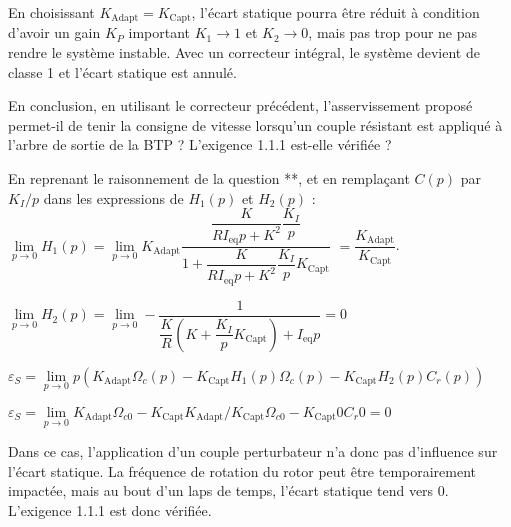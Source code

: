 \ifprof
\begin{corrige}
En choisissant $K_{\text{Adapt}}=K_{\text{Capt}}$, l’écart statique pourra être réduit à condition d’avoir un gain $K_P$ important $K_1\to 1$ et $K_2\to 0$, mais pas trop pour ne pas rendre le système instable.
Avec un correcteur intégral, le système devient de classe 1 et l’écart statique est annulé.
\end{corrige}
\else
\fi


\begin{question}
En conclusion, en utilisant le correcteur précédent, l'asservissement proposé permet-il de tenir la consigne de vitesse lorsqu'un couple résistant est appliqué à l'arbre de sortie de la BTP ? L'exigence 1.1.1 est-elle vérifiée ?
\end{question}

\ifprof
\begin{corrige}


En reprenant le raisonnement de la question **, et en remplaçant $C(p)$ par $K_I/p$ dans les expressions de $H_1 (p)$ et $H_2 (p)$ :
$\lim\limits_{p\to 0}  H_1 (p)=\lim\limits_{p\to 0}  K_{\text{Adapt}} \dfrac{\dfrac{K}{R I_{\text{eq}} p+K^2}\dfrac{ K_I}{p}}{1+\dfrac{K}{R I_{\text{eq}} p+K^2 } \dfrac{K_I}{p} K_{\text{Capt}} }$
$=\dfrac{K_{\text{Adapt}}}{K_{\text{Capt}}}$.

$\lim\limits_{p\to 0}  H_2 (p)=\lim\limits_{p\to 0}  -\dfrac{1}{\dfrac{K}{R} \left(K+\dfrac{K_I}{p} K_{\text{Capt}} \right)+I_{\text{eq}} p}=0$

$\varepsilon_S=\lim\limits_{p\to 0}  p \left(K_{\text{Adapt}} \Omega_c (p)-K_{\text{Capt}} H_1 (p) \Omega_c (p)-K_{\text{Capt}} H_2 (p) C_r (p)\right) $

$\varepsilon_S=\lim\limits_{p\to 0} K_{\text{Adapt}} \Omega_{c0}-K_{\text{Capt}} K_{\text{Adapt}}/K_{\text{Capt}}  \Omega_{c0}-K_{\text{Capt}} 0 C_r0 =0$

Dans ce cas, l’application d’un couple perturbateur n’a donc pas d’influence sur l’écart statique. La fréquence de rotation du rotor peut être temporairement impactée, mais au bout d’un laps de temps, l’écart statique tend vers 0. L’exigence 1.1.1 est donc vérifiée.

\end{corrige}
\else
\fi


